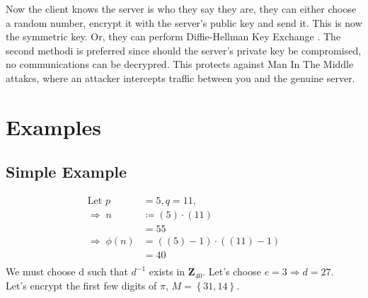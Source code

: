 \documentclass{article}
\begin{document}
Now the client knows the server is who they say they are,
they can either choose a random number, encrypt it with the server's public key and send it.
This is now the symmetric key.
Or, they can perform Diffie-Hellman Key Exchange \cite{Directions}.
The second methodi is preferred since should the server's private key be compromised,
no communications can be decrypred.
This protects against Man In The Middle attakcs, where an attacker intercepts traffic between you and the genuine server.

\section{Examples}
\subsection{Simple Example}
\begin{align*}
    \text{Let }     p       & = 5, q = 11,               \\
    \Rightarrow\;   n       & \coloneqq (5) \cdot (11)   \\
                            & = 55                       \\
    \Rightarrow \;  \phi(n) & = ((5) -1) \cdot ((11) -1) \\
                            & = 40                       \\
\end{align*}
We must choose d such that $d^{-1}$ exists in $\mathbf{Z}_{40}$.
Let's choose $e = 3 \Rightarrow d = 27$. \\
Let's encrypt the first few digits of $\pi$, $M = \left\{31, 14 \right\}$.
\end{document}
